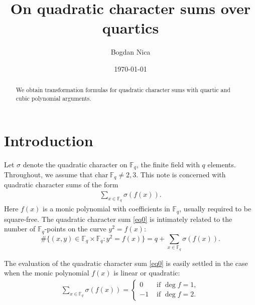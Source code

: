 \documentclass[11pt]{amsart}
\newcommand{\F}{\mathbb{F}}
\newcommand{\Fq}{\F_{\!q}}
\theoremstyle{definition}
\begin{document}
\title{On quadratic character sums over quartics}

\begin{abstract}
We obtain transformation formulas for quadratic character sums with quartic and cubic polynomial arguments. 

\end{abstract}

\date{\today}
\author{Bogdan Nica}

\address{\newline Department of Mathematical Sciences \newline Indiana University Indianapolis}

\maketitle

\section{Introduction}
Let $\sigma$ denote the quadratic character on $\Fq$, the finite field with $q$ elements. Throughout, we assume that $\mathrm{char} \: \Fq\neq 2,3$. This note is concerned with quadratic character sums of the form
\begin{align}\label{eq0}
\sum_{x\in \Fq} \sigma(f(x)).\tag{$S_f$}
\end{align}
Here $f(x)$ is a monic polynomial with coefficients in $\Fq$, usually required to be square-free. The quadratic character sum \eqref{eq0} is intimately related to the number of $\Fq$-points on the curve $y^2=f(x)$:
\[\#\big\{(x,y)\in \Fq\times \Fq: y^2=f(x)\big\}=q+\sum_{x\in \Fq} \sigma(f(x)).\]

The evaluation of the quadratic character sum \eqref{eq0} is easily settled in the case when the monic polynomial $f(x)$ is linear or quadratic:
\begin{align}
\sum_{x\in \Fq} \sigma(f(x))=\begin{cases}
0 & \textrm{ if } \deg f=1,\\
-1 & \textrm{ if } \deg f=2.
\end{cases}
\end{align}
\end{document}
